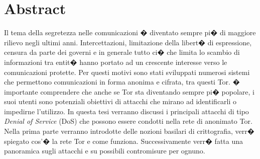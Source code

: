 \chapter{Abstract}
Il tema della segretezza nelle comunicazioni � diventato sempre pi� di maggiore rilievo negli ultimi anni. Intercettazioni, limitazione della libert� di espressione, censura da parte dei governi e in generale tutto ci� che limita lo scambio di informazioni tra entit� hanno portato ad un crescente interesse verso le comunicazioni protette. Per questi motivi sono stati sviluppati numerosi sistemi che permettono comunicazioni in forma anonima e cifrata, tra questi Tor. � importante comprendere che anche se Tor sta diventando sempre pi� popolare, i suoi utenti sono potenziali obiettivi di attacchi che mirano ad identificarli o impedirne l'utilizzo.
In questa tesi verranno discussi i principali attacchi di tipo \emph{Denial of Service} (DoS) che possono essere condotti nella rete di anonimato Tor. Nella prima parte verranno introdotte delle nozioni basilari di crittografia, verr� spiegato cos'� la rete Tor e come funziona. Successivamente verr� fatta una panoramica sugli attacchi e su possibili contromisure per ognuno. 

%
%

